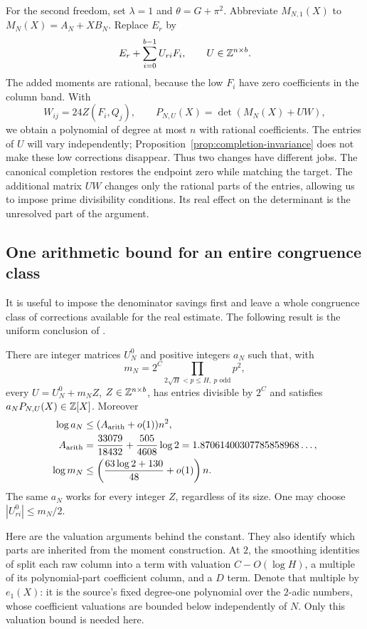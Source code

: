 For the second freedom, set $\lambda=1$ and $\theta=G+\pi^2$.
Abbreviate $M_{N,1}(X)$ to $M_N(X)=A_N+XB_N$. Replace $E_r$ by
\[
 E_r+\sum_{i=0}^{b-1}U_{ri}F_i,\qquad U\in\mathbb Z^{n\times b}.
\]
The added moments are rational, because the low $F_i$ have zero
coefficients in the column band. With
\begin{equation}\label{eq:corrected-pencil}
 W_{ij}=24Z(F_i,Q_j),\qquad
 P_{N,U}(X)=\det(M_N(X)+UW),
\end{equation}
we obtain a polynomial of degree at most $n$ with rational coefficients.
The entries of $U$ will vary independently; Proposition~\ref{prop:completion-invariance}
does not make these low corrections disappear.
Thus two changes have different jobs. The canonical completion restores
the endpoint zero while matching the target. The additional matrix $UW$
changes only the rational parts of the entries, allowing us to impose
prime divisibility conditions. Its real effect on the determinant is
the unresolved part of the argument.

\subsection{One arithmetic bound for an entire congruence class}

It is useful to impose the denominator savings first and leave a whole
congruence class of corrections available for the real estimate.
The following result is the uniform conclusion of .

\begin{theorem}\label{thm:arithmetic-cost}
There are integer matrices $U_N^0$ and positive integers $a_N$ such that,
with
\[
 m_N=2^C\prod_{2\sqrt H<p\le H,\ p\text{ odd}}p^2,
\]
every $U=U_N^0+m_N Z$, $Z\in\mathbb Z^{n\times b}$, has entries divisible
by $2^C$ and satisfies $a_NP_{N,U}(X)\in\mathbb Z[X]$. Moreover
\begin{align}
 \log a_N&\le (A_{\rm arith}+o(1))n^2,\label{eq:arithmetic-rate}\\
 A_{\rm arith}&=\frac{33079}{18432}+\frac{505}{4608}\log2
 =1.87061400307785858968\ldots,\nonumber\\
 \log m_N&\le\left(\frac{63\log2+130}{48}+o(1)\right)n.\nonumber
\end{align}
The same $a_N$ works for every integer $Z$, regardless of its size.
One may choose $|U^0_{ri}|\le m_N/2$.
\end{theorem}

Here are the valuation arguments behind the constant. They also identify
which parts are inherited from the moment construction.
At $2$, the smoothing identities of \cite[(22)--(27)]{OpenAI} split
each raw column into a term with valuation $C-O(\log H)$, a multiple
of its polynomial-part coefficient column, and a $D$ term. Denote that
multiple by $e_1(X)$: it is the source's fixed degree-one polynomial
over the $2$-adic numbers, whose coefficient valuations are bounded below
independently of $N$. Only this valuation bound is needed here.


